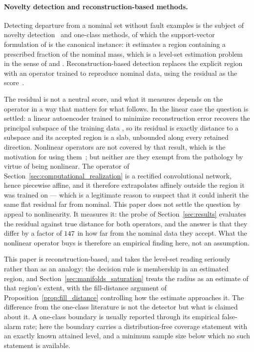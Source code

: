\documentclass[a4paper]{cas-sc}
\begin{document}
\paragraph{Novelty detection and reconstruction-based methods.}
Detecting departure from a nominal set without fault examples is the subject
of novelty detection~\citep{bishop1994} and one-class methods, of which the
support-vector formulation of \citet{scholkopf1999,scholkopf2001} is the
canonical instance: it estimates a region containing a prescribed fraction of
the nominal mass, which is a level-set estimation problem in the sense of
\citet{devroye1980} and \citet{scott2006}. Reconstruction-based detection
replaces the explicit region with an operator trained to reproduce nominal
data, using the residual as the score~\citep{hinton2006,sakurada2014}.

The residual is not a neutral score, and what it measures depends on the
operator in a way that matters for what follows. In the linear case the
question is settled: a linear autoencoder trained to minimize reconstruction
error recovers the principal subspace of the training data
\citep{bourlard1988,baldi1989}, so its residual is exactly distance to a
subspace and its accepted region is a slab, unbounded along every retained
direction. Nonlinear operators are not covered by that result, which is the
motivation for using them~\citep{hinton2006}; but neither are they exempt from
the pathology by virtue of being nonlinear. The operator of
Section~\ref{sec:computational_realization} is a rectified convolutional
network, hence piecewise affine, and it therefore extrapolates affinely
outside the region it was trained on --- which is a legitimate reason to
suspect that it could inherit the same flat residual far from nominal.
This paper does not settle the question by appeal to nonlinearity. It
measures it: the probe of Section~\ref{sec:results} evaluates the residual
against true distance for both operators, and the answer is that they differ
by a factor of \(147\) in how far from the nominal data they accept. What the nonlinear operator
buys is therefore an empirical finding here, not an assumption.

This paper is reconstruction-based, and takes the level-set reading
seriously rather than as an analogy: the decision rule is membership in an
estimated region, and Section~\ref{sec:manifolds_saturation} treats the radius
as an estimate of that region's extent, with the fill-distance argument of
Proposition~\ref{prop:fill_distance} controlling how the estimate approaches
it. The difference from the one-class literature is not the detector but what
is claimed about it. A one-class boundary is usually reported through its
empirical false-alarm rate; here the boundary carries a distribution-free
coverage statement with an exactly known attained level, and a minimum sample
size below which no such statement is available.
\end{document}
